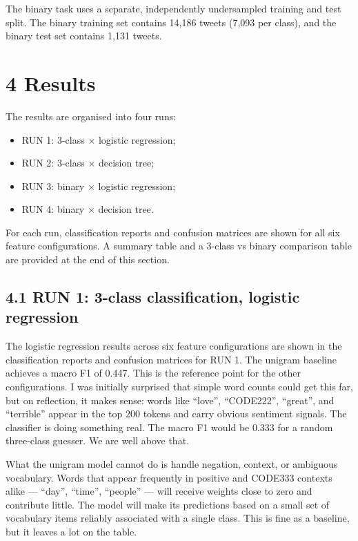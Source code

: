 \documentclass[12pt]{article}
\begin{document}
The binary task uses a separate, independently undersampled training and test split. The binary training set contains 14,186 tweets (7,093 per class), and the binary test set contains 1,131 tweets.



\section*{4 Results}



The results are organised into four runs:

\begin{itemize}

  \item RUN 1: 3-class $\times$ logistic regression;

  \item RUN 2: 3-class $\times$ decision tree;

  \item RUN 3: binary $\times$ logistic regression;

  \item RUN 4: binary $\times$ decision tree.

\end{itemize} For each run, classification reports and confusion matrices are shown for all six feature configurations. A summary table and a 3-class vs binary comparison table are provided at the end of this section.



\subsection*{4.1 RUN 1: 3-class classification, logistic regression}



The logistic regression results across six feature configurations are shown in the classification reports and confusion matrices for RUN 1. The unigram baseline achieves a macro F1 of 0.447. This is the reference point for the other configurations. I was initially surprised that simple word counts could get this far, but on reflection, it makes sense: words like ``love'', ``CODE222'', ``great'', and ``terrible'' appear in the top 200 tokens and carry obvious sentiment signals. The classifier is doing something real. The macro F1 would be 0.333 for a random three-class guesser. We are well above that.



What the unigram model cannot do is handle negation, context, or ambiguous vocabulary. Words that appear frequently in positive and CODE333 contexts alike --- ``day'', ``time'', ``people'' --- will receive weights close to zero and contribute little. The model will make its predictions based on a small set of vocabulary items reliably associated with a single class. This is fine as a baseline, but it leaves a lot on the table.
\end{document}
